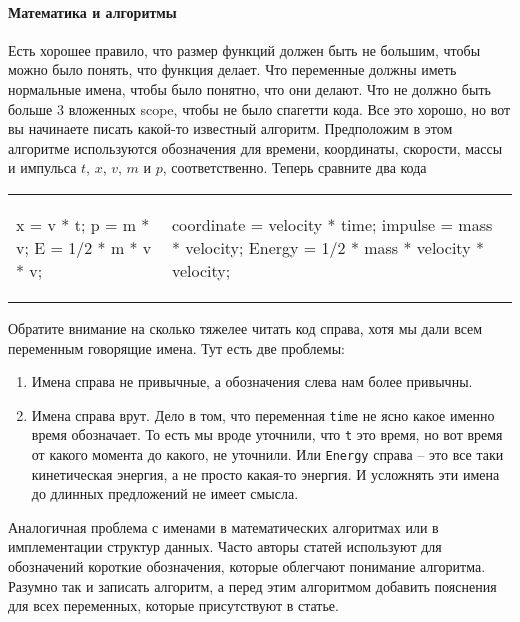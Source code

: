 \paragraph{Математика и алгоритмы}

Есть хорошее правило, что размер функций должен быть не большим, чтобы можно было понять, что функция делает.
Что переменные должны иметь нормальные имена, чтобы было понятно, что они делают.
Что не должно быть больше $3$ вложенных scope, чтобы не было спагетти кода.
Все это хорошо, но вот вы начинаете писать какой-то известный алгоритм.
Предположим в этом алгоритме используются обозначения для времени, координаты, скорости, массы и импульса $t$, $x$, $v$, $m$ и $p$, соответственно.
Теперь сравните два кода
\begin{center}
\begin{tabular}{ll}
{
\begin{minipage}[\baselineskip]{8cm}
\begin{cppcode}[numbers = none]
x = v * t;
p = m * v;
E = 1/2 * m * v * v;
\end{cppcode}
\end{minipage}
}&{
\begin{minipage}[\baselineskip]{8cm}
\begin{cppcode}[numbers = none]
coordinate = velocity * time;
impulse = mass * velocity;
Energy = 1/2 * mass * velocity * velocity;
\end{cppcode}
\end{minipage}
}\\
\end{tabular}
\end{center}
Обратите внимание на сколько тяжелее читать код справа, хотя мы дали всем переменным говорящие имена.
Тут есть две проблемы:
\begin{enumerate}
\item Имена справа не привычные, а обозначения слева нам более привычны.

\item Имена справа врут.
Дело в том, что переменная \verb"time" не ясно какое именно время обозначает.
То есть мы вроде уточнили, что \verb"t" это время, но вот время от какого момента до какого, не уточнили.
Или \verb"Energy" справа -- это все таки кинетическая энергия, а не просто какая-то энергия.
И усложнять эти имена до длинных предложений не имеет смысла.
\end{enumerate}
Аналогичная проблема с именами в математических алгоритмах или в имплементации структур данных.
Часто авторы статей используют для обозначений короткие обозначения, которые облегчают понимание алгоритма.
Разумно так и записать алгоритм, а перед этим алгоритмом добавить пояснения для всех переменных, которые присутствуют в статье.

